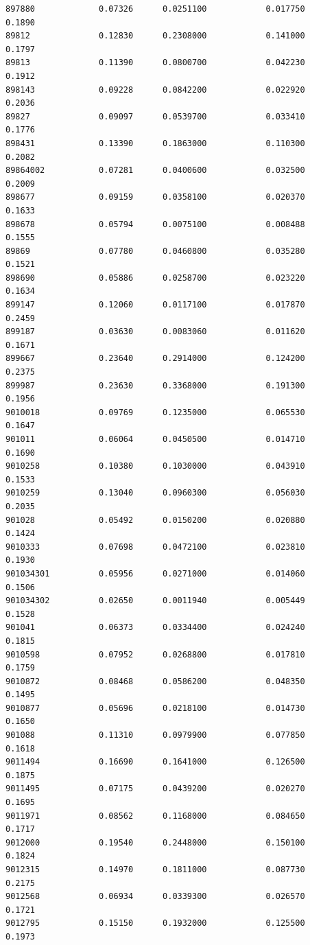 \documentclass[
  letterpaper,
  DIV=11,
  numbers=noendperiod]{scrartcl}
\begin{document}
\begin{verbatim}
897880             0.07326      0.0251100            0.017750        0.1890
89812              0.12830      0.2308000            0.141000        0.1797
89813              0.11390      0.0800700            0.042230        0.1912
898143             0.09228      0.0842200            0.022920        0.2036
89827              0.09097      0.0539700            0.033410        0.1776
898431             0.13390      0.1863000            0.110300        0.2082
89864002           0.07281      0.0400600            0.032500        0.2009
898677             0.09159      0.0358100            0.020370        0.1633
898678             0.05794      0.0075100            0.008488        0.1555
89869              0.07780      0.0460800            0.035280        0.1521
898690             0.05886      0.0258700            0.023220        0.1634
899147             0.12060      0.0117100            0.017870        0.2459
899187             0.03630      0.0083060            0.011620        0.1671
899667             0.23640      0.2914000            0.124200        0.2375
899987             0.23630      0.3368000            0.191300        0.1956
9010018            0.09769      0.1235000            0.065530        0.1647
901011             0.06064      0.0450500            0.014710        0.1690
9010258            0.10380      0.1030000            0.043910        0.1533
9010259            0.13040      0.0960300            0.056030        0.2035
901028             0.05492      0.0150200            0.020880        0.1424
9010333            0.07698      0.0472100            0.023810        0.1930
901034301          0.05956      0.0271000            0.014060        0.1506
901034302          0.02650      0.0011940            0.005449        0.1528
901041             0.06373      0.0334400            0.024240        0.1815
9010598            0.07952      0.0268800            0.017810        0.1759
9010872            0.08468      0.0586200            0.048350        0.1495
9010877            0.05696      0.0218100            0.014730        0.1650
901088             0.11310      0.0979900            0.077850        0.1618
9011494            0.16690      0.1641000            0.126500        0.1875
9011495            0.07175      0.0439200            0.020270        0.1695
9011971            0.08562      0.1168000            0.084650        0.1717
9012000            0.19540      0.2448000            0.150100        0.1824
9012315            0.14970      0.1811000            0.087730        0.2175
9012568            0.06934      0.0339300            0.026570        0.1721
9012795            0.15150      0.1932000            0.125500        0.1973

\end{verbatim}
\end{document}
